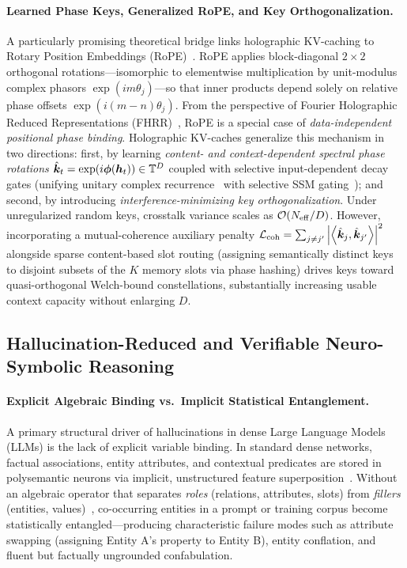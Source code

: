\paragraph{Learned Phase Keys, Generalized RoPE, and Key Orthogonalization.}
A particularly promising theoretical bridge links holographic KV-caching to Rotary Position Embeddings (RoPE)~\cite{SU_2024_ROPE}.
RoPE applies block-diagonal $2\times 2$ orthogonal rotations---isomorphic to elementwise multiplication by unit-modulus complex phasors $\exp(i m \theta_j)$---so that inner products depend solely on relative phase offsets $\exp(i(m-n)\theta_j)$.
From the perspective of Fourier Holographic Reduced Representations (FHRR)~\cite{PLATE_1995_HRR,SCHLEGEL_VSA_COMPARISON}, RoPE is a special case of \emph{data-independent positional phase binding}.
Holographic KV-caches generalize this mechanism in two directions: first, by learning \emph{content- and context-dependent spectral phase rotations} $\hat{\boldsymbol{k}}_t = \exp(i \boldsymbol{\phi}(\boldsymbol{h}_t)) \in \mathbb{T}^D$ coupled with selective input-dependent decay gates (unifying unitary complex recurrence~\cite{ARJOVSKY_2016_URNN} with selective SSM gating~\cite{GU_SSM_S4_MAMBA}); and second, by introducing \emph{interference-minimizing key orthogonalization}.
Under unregularized random keys, crosstalk variance scales as $\mathcal{O}\!\left(N_{\mathrm{eff}}/D\right)$.
However, incorporating a mutual-coherence auxiliary penalty $\mathcal{L}_{\mathrm{coh}} = \sum_{j \neq j'} \left\lvert \left\langle \hat{\boldsymbol{k}}_j, \hat{\boldsymbol{k}}_{j'} \right\rangle \right\rvert^2$ alongside sparse content-based slot routing (assigning semantically distinct keys to disjoint subsets of the $K$ memory slots via phase hashing) drives keys toward quasi-orthogonal Welch-bound constellations, substantially increasing usable context capacity without enlarging $D$.

\subsection{Hallucination-Reduced and Verifiable Neuro-Symbolic Reasoning}\label{sec:potentials:reasoning}

\paragraph{Explicit Algebraic Binding vs.\ Implicit Statistical Entanglement.}
A primary structural driver of hallucinations in dense Large Language Models (LLMs) is the lack of explicit variable binding.
In standard dense networks, factual associations, entity attributes, and contextual predicates are stored in polysemantic neurons via implicit, unstructured feature superposition~\cite{ELHAGE_2022_SUPERPOSITION}.
Without an algebraic operator that separates \emph{roles} (relations, attributes, slots) from \emph{fillers} (entities, values)~\cite{SMOLENSKY_1990_TPR}, co-occurring entities in a prompt or training corpus become statistically entangled---producing characteristic failure modes such as attribute swapping (assigning Entity A's property to Entity B), entity conflation, and fluent but factually ungrounded confabulation.

